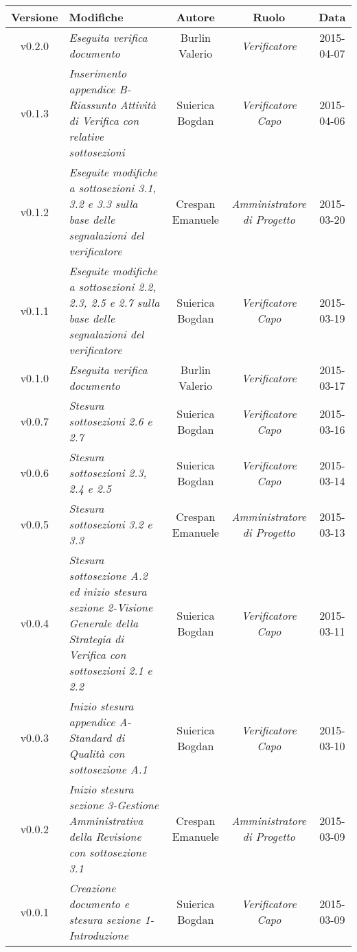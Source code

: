 \newpage

\begin{table}[h]
\centering
\begin{tabular}{|c|p{}|c|c|c|}
	\toprule
		\textbf{Versione} & \textbf{Modifiche} & \textbf{Autore} & \textbf{Ruolo} & \textbf{Data} \\
	\midrule
	\midrule
		v0.2.0 & \textit{Eseguita verifica documento} & Burlin Valerio & \textit{Verificatore} & 2015-04-07\\
	\midrule
		v0.1.3 & \textit{Inserimento appendice B-Riassunto Attività di Verifica con relative sottosezioni} & Suierica Bogdan & \textit{Verificatore Capo} & 2015-04-06\\
	\midrule
		v0.1.2 & \textit{Eseguite modifiche a sottosezioni 3.1, 3.2 e 3.3 sulla base delle segnalazioni del verificatore} & Crespan Emanuele & \textit{Amministratore di Progetto} & 2015-03-20\\
	\midrule
		v0.1.1 & \textit{Eseguite modifiche a sottosezioni 2.2, 2.3, 2.5 e 2.7 sulla base delle segnalazioni del verificatore} & Suierica Bogdan & \textit{Verificatore Capo} & 2015-03-19\\
	\midrule
		v0.1.0 & \textit{Eseguita verifica documento} & Burlin Valerio & \textit{Verificatore} & 2015-03-17\\
	\midrule
		v0.0.7 & \textit{Stesura sottosezioni 2.6 e 2.7} & Suierica Bogdan & \textit{Verificatore Capo} & 2015-03-16\\
	\midrule
		v0.0.6 & \textit{Stesura sottosezioni 2.3, 2.4 e 2.5} & Suierica Bogdan & \textit{Verificatore Capo} & 2015-03-14\\
	\midrule
		v0.0.5 & \textit{Stesura sottosezioni 3.2 e 3.3} & Crespan Emanuele & \textit{Amministratore di Progetto} & 2015-03-13\\
	\midrule
		v0.0.4 & \textit{Stesura sottosezione A.2 ed inizio stesura sezione 2-Visione Generale della Strategia di Verifica con sottosezioni 2.1 e 2.2} & Suierica Bogdan & \textit{Verificatore Capo} & 2015-03-11\\
	\midrule
		v0.0.3 & \textit{Inizio stesura appendice A-Standard di Qualità con sottosezione A.1} & Suierica Bogdan & \textit{Verificatore Capo} & 2015-03-10\\
	\midrule
		v0.0.2 & \textit{Inizio stesura sezione 3-Gestione Amministrativa della Revisione con sottosezione 3.1} & Crespan Emanuele & \textit{Amministratore di Progetto} & 2015-03-09\\
	\midrule
		v0.0.1 & \textit{Creazione documento e stesura sezione 1-Introduzione} & Suierica Bogdan & \textit{Verificatore Capo} & 2015-03-09\\
	\bottomrule
\end{tabular}
\end{table}

\newpage
